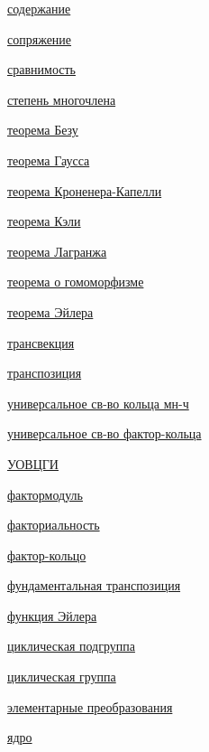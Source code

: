 \documentclass[a4paper,100pt]{article}
\theoremstyle{indented}
\theoremstyle{definition}
\theoremstyle{remark}
\begin{document}
\begin{multicols}{2}
    \hyperlink{n30}{содержание}\

    \hyperlink{n81}{сопряжение}\

    \hyperlink{n23}{сравнимость}\

    \hyperlink{n29}{степень многочлена}\

    \hyperlink{n34}{теорема Безу}\

    \hyperlink{n32}{теорема Гаусса}\

    \hyperlink{n64}{теорема Кроненера-Капелли}\

    \hyperlink{n80}{теорема Кэли}\

    \hyperlink{n90}{теорема Лагранжа}\

    \hyperlink{n25}{теорема о гомоморфизме}\

    \hyperlink{n91}{теорема Эйлера}\

    \hyperlink{n57}{трансвекция}\

    \hyperlink{n74}{транспозиция}\

    \hyperlink{n33}{универсальное св-во кольца мн-ч}\

    \hyperlink{n26}{универсальное св-во фактор-кольца}\

    \hyperlink{n11}{УОВЦГИ}\

    \hyperlink{n50}{фактормодуль}\

    \hyperlink{n12}{факториальность}\

    \hyperlink{n24}{фактор-кольцо}\

    \hyperlink{n75}{фундаментальная транспозиция}\

    \hyperlink{n85}{функция Эйлера}\

    \hyperlink{n68}{циклическая подгруппа}\

    \hyperlink{n67}{циклическая группа}\

    \hyperlink{n59}{элементарные преобразования}\

    \hyperlink{n20}{ядро}\
    

\end{multicols}
\end{document}
